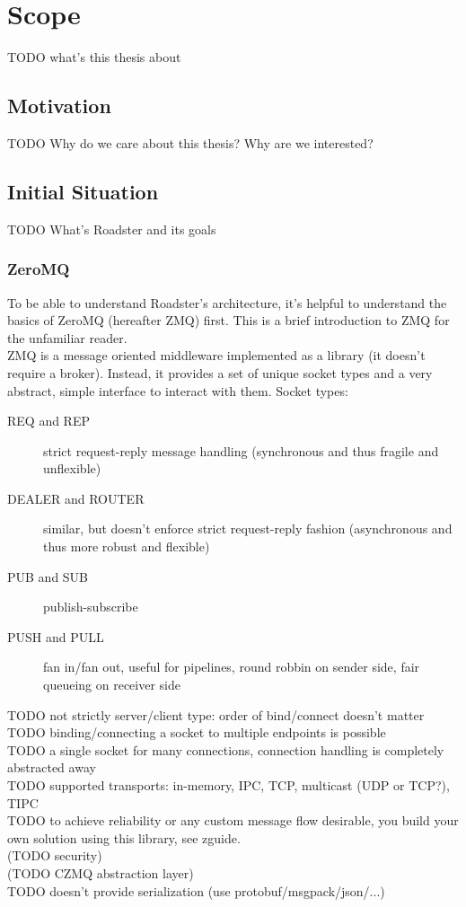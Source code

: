 \chapter{Scope}
TODO what's this thesis about

\section{Motivation}
TODO Why do we care about this thesis? Why are we interested?

\section{Initial Situation}
TODO What's Roadster and its goals

\subsection{ZeroMQ}
To be able to understand Roadster's architecture, it's helpful to understand
the basics of ZeroMQ (hereafter ZMQ) first. This is a brief introduction to ZMQ
for the unfamiliar reader.\\

ZMQ is a message oriented middleware implemented as a library (it doesn't
require a broker). Instead, it provides a set of unique socket types and a very
abstract, simple interface to interact with them. Socket types:\\

\begin{description}
	\item [REQ and REP] strict request-reply message handling (synchronous
		and thus fragile and unflexible)

	\item [DEALER and ROUTER] similar, but doesn't enforce strict
		request-reply fashion (asynchronous and thus more robust and
		flexible)

	\item [PUB and SUB] publish-subscribe

	\item [PUSH and PULL] fan in/fan out, useful for pipelines, round
		robbin on sender side, fair queueing on receiver side
\end{description}

TODO not strictly server/client type: order of bind/connect doesn't matter\\
TODO binding/connecting a socket to multiple endpoints is possible\\
TODO a single socket for many connections, connection handling is completely abstracted away\\
TODO supported transports: in-memory, IPC, TCP, multicast (UDP or TCP?), TIPC\\
TODO to achieve reliability or any custom message flow desirable, you build your own solution using this library, see zguide.\\
(TODO security)\\
(TODO CZMQ abstraction layer)\\
TODO doesn't provide serialization (use protobuf/msgpack/json/...)

